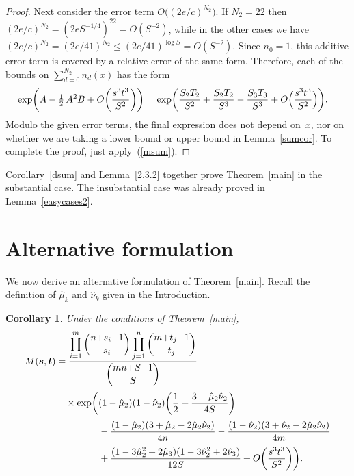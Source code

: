\documentclass[12pt]{article}
\newtheorem{corollary}[theorem]{Corollary}
\numberwithin{equation}{section}
\def\({\bigl(}   \def\){\bigr)}
\def\svec{{\boldsymbol{s}}}
\def\tvec{{\boldsymbol{t}}}
\begin{document}
\begin{proof}
Next consider the error term $O\((2e/c)^{N_2}\)$.
If $N_2=22$ then $(2e/c)^{N_2} = (2eS^{-1/4})^{22} = O(S^{-2})$,
while in the other cases we have
$(2e/c)^{N_2} = (2e/41)^{N_2}\leq (2e/41)^{\log S} = O(S^{-2})$. 
Since $n_0=1$,
this additive error term is covered by a relative error of the same form.
Therefore, each of the bounds on $\sum_{d=0}^{N_2} n_d(x)$
has the form
\begin{align*}
  \exp\biggl(A - \tfrac{1}{2}\, A^2B + 
      O\biggl(\frac{s^3t^3}{S^2}\biggr)\biggr)
  &= \exp\biggl({\frac{S_2T_2}{S^2}} + {\frac{S_2T_2}{S^3}}
      - {\frac{S_3T_3}{S^3}} 
            + O\Bigl(\frac{s^3t^3}{S^2}\Bigr)\biggr).
\end{align*}
Modulo the given error terms, the final expression does not depend
on~$x$, nor on whether we are taking a lower bound or upper bound
in Lemma~\ref{sumcor}. 
To complete the proof, just apply~(\ref{msum}).
\end{proof}

\bigskip
Corollary~\ref{dsum} and Lemma~\ref{2.3.2} together prove
Theorem~\ref{main} in the substantial case.
The insubstantial case was already proved in Lemma~\ref{easycases2}.

\section{Alternative formulation}\label{s:alternative}

We now derive an alternative formulation of Theorem~\ref{main}.
Recall the definition
of $\hat{\mu}_k$ and $\hat{\nu}_k$ given in the Introduction.

\begin{corollary}\label{munu2}
Under the conditions of Theorem~\ref{main},
\begin{align*}
M(\svec,\tvec) &=
  \frac{\displaystyle\prod_{i=1}^m\binom{n{+}s_i{-}1}{s_i}
   \prod_{j=1}^n\binom{m{+}t_j{-}1}{t_j}}
          {\displaystyle\binom{mn{+}S{-}1}{S}}\\[0.5ex]
  &{\quad}\times \exp\biggl(  
  (1-\hat{\mu}_2)(1-\hat{\nu}_2)\biggl(\frac{1}{2}+
  \frac{3-\hat{\mu}_2\hat{\nu}_2}{4S}\biggr)
\\[0.5ex]
  &{\kern 4.5em} - \frac{(1-\hat{\mu}_2)(3+\hat{\mu}_2-2\hat{\mu}_2\hat{\nu}_2)}{4n}
       - \frac{(1-\hat{\nu}_2)(3+\hat{\nu}_2-2\hat{\mu}_2\hat{\nu}_2)}{4m}
  \\[0.5ex]
  &{\kern 4.5em} + \frac{(1-3{\hat{\mu}_2}^2+2\hat{\mu}_3)
           (1-3{\hat{\nu}_2}^2+2\hat{\nu}_3)}{12S}
              +O\biggl(\frac{s^3t^3}{S^2}\biggr)\biggr).
\end{align*}
\end{corollary}
\end{document}
